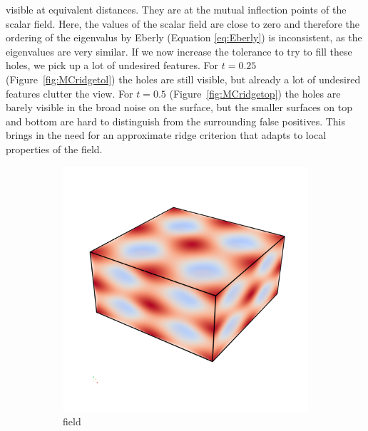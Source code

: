 visible at equivalent distances. They are at the mutual inflection
points of the scalar field. Here, the values of the scalar field are
close to zero and therefore the ordering of the eigenvalus by Eberly
(Equation \ref{eq:Eberly}) is inconsistent, as the eigenvalues are very
similar. If we now increase the tolerance to try to fill these holes, we
pick up a lot of undesired features. For $t=0.25$
(Figure~\ref{fig:MCridgetol}) the holes are still visible, but already a
lot of undesired features clutter the view. For $t=0.5$
(Figure~\ref{fig:MCridgetop}) the holes are barely visible in the broad
noise on the surface, but the smaller surfaces on top and bottom are
hard to distinguish from the surrounding false positives. This brings in
the need for an approximate ridge criterion that adapts to local
properties of the field.
\begin{figure}
    \begin{subfigure}[b]{0.49\textwidth}
        \includegraphics[width=\textwidth]{Images/sfield.png}
        \caption{field}
        \label{fig:sfield}
    \end{subfigure}
    \begin{subfigure}[b]{0.49\textwidth}

\end{subfigure}
\end{figure}
